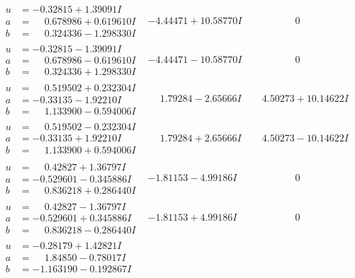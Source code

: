 \documentclass[1p]{elsarticle_modified}
\theoremstyle{definition}
\begin{document}
$$\begin{array}{c|c|c}
\begin{aligned}
u &= -0.32815 + 1.39091 I \\
a &= \phantom{-}0.678986 + 0.619610 I \\
b &= \phantom{-}0.324336 - 1.298330 I\end{aligned}
 & -4.44471 + 10.58770 I & \phantom{-0.000000 } 0 \\ \hline\begin{aligned}
u &= -0.32815 - 1.39091 I \\
a &= \phantom{-}0.678986 - 0.619610 I \\
b &= \phantom{-}0.324336 + 1.298330 I\end{aligned}
 & -4.44471 - 10.58770 I & \phantom{-0.000000 } 0 \\ \hline\begin{aligned}
u &= \phantom{-}0.519502 + 0.232304 I \\
a &= -0.33135 - 1.92210 I \\
b &= \phantom{-}1.133900 - 0.594006 I\end{aligned}
 & \phantom{-}1.79284 - 2.65666 I & \phantom{-}4.50273 + 10.14622 I \\ \hline\begin{aligned}
u &= \phantom{-}0.519502 - 0.232304 I \\
a &= -0.33135 + 1.92210 I \\
b &= \phantom{-}1.133900 + 0.594006 I\end{aligned}
 & \phantom{-}1.79284 + 2.65666 I & \phantom{-}4.50273 - 10.14622 I \\ \hline\begin{aligned}
u &= \phantom{-}0.42827 + 1.36797 I \\
a &= -0.529601 - 0.345886 I \\
b &= \phantom{-}0.836218 + 0.286440 I\end{aligned}
 & -1.81153 - 4.99186 I & \phantom{-0.000000 } 0 \\ \hline\begin{aligned}
u &= \phantom{-}0.42827 - 1.36797 I \\
a &= -0.529601 + 0.345886 I \\
b &= \phantom{-}0.836218 - 0.286440 I\end{aligned}
 & -1.81153 + 4.99186 I & \phantom{-0.000000 } 0 \\ \hline\begin{aligned}
u &= -0.28179 + 1.42821 I \\
a &= \phantom{-}1.84850 - 0.78017 I \\
b &= -1.163190 - 0.192867 I\end{aligned}

\end{array}$$
\end{document}

